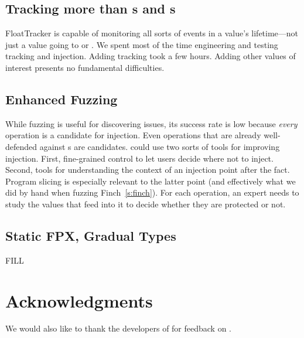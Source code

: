 \documentclass{juliacon}
\begin{document}
\subsection{Tracking more than \NaN{}s and \Inf{}s}
FloatTracker is capable of monitoring all sorts of events in a \fp{} value's lifetime---not just a value going to \NaN{} or \Inf{}.
We spent most of the time engineering and testing \NaN{} tracking and injection.
Adding \Inf{} tracking took a few hours.
Adding other values of interest presents no fundamental difficulties.

\subsection{Enhanced Fuzzing}

While fuzzing is useful for discovering issues, its success rate
is low because \emph{every} \fp{} operation is a candidate
for injection.
Even operations that are already well-defended against \NaN{}s are candidates.
\FT{} could use two sorts of tools for improving injection.
First, fine-grained control to let users decide where not to inject.
Second, tools for understanding the context of an injection point
after the fact.
Program slicing is especially relevant to the latter point (and effectively
what we did by hand when fuzzing Finch~\cref{s:finch}).
For each operation, an expert needs to study the values that feed into it to
decide whether they are protected or not.


\subsection{Static FPX, Gradual Types}

FILL


\section{Acknowledgments}

We would also like to thank the developers of  for feedback on \FlowFPX{}.


\end{document}
